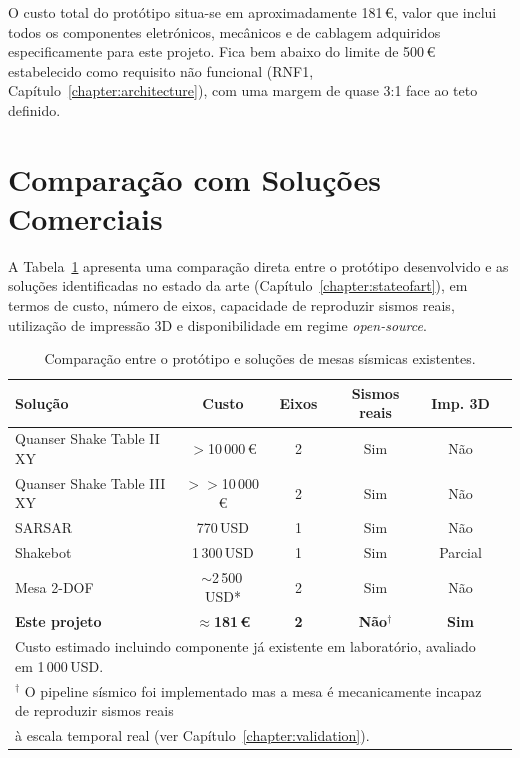O custo total do protótipo situa-se em aproximadamente 181\,\euro{}, valor que inclui todos os componentes eletrónicos, mecânicos e de cablagem adquiridos especificamente para este projeto. Fica bem abaixo do limite de 500\,\euro{} estabelecido como requisito não funcional (RNF1, Capítulo~\ref{chapter:architecture}), com uma margem de quase 3:1 face ao teto definido.
\section{Comparação com Soluções Comerciais}
\label{sec:comparacao-comercial}

A Tabela~\ref{tab:comparacao-custos} apresenta uma comparação direta entre o protótipo desenvolvido e as soluções identificadas no estado da arte (Capítulo~\ref{chapter:stateofart}), em termos de custo, número de eixos, capacidade de reproduzir sismos reais, utilização de impressão 3D e disponibilidade em regime \textit{open-source}.

\begin{table}[h]
\centering
\caption{Comparação entre o protótipo e soluções de mesas sísmicas existentes.}
\label{tab:comparacao-custos}
\begin{tabular}{lccccc}
\hline
\textbf{Solução} & \textbf{Custo} & \textbf{Eixos} & \textbf{Sismos reais} & \textbf{Imp. 3D} \\
\hline
Quanser Shake Table II XY~\cite{QuanserShakeTableIIXY} & $>$10\,000\,\euro{} & 2 & Sim & Não \\
Quanser Shake Table III XY~\cite{QuanserShakeTableIII} & $>>$10\,000\,\euro{} & 2 & Sim & Não \\
SARSAR~\cite{Damci2018}                                & 770\,USD   & 1 & Sim & Não \\
Shakebot~\cite{Shakebot2022}                           & 1\,300\,USD        & 1 & Sim & Parcial \\
Mesa 2-DOF~\cite{2DOF2025}                             & $\sim$2\,500\,USD* & 2 & Sim & Não \\
\textbf{Este projeto}                                  & \textbf{$\approx$181\,\euro{}} & \textbf{2} & \textbf{Não$^\dagger$} & \textbf{Sim} \\
\hline
\multicolumn{5}{l}{\footnotesize * Custo estimado incluindo componente já existente em laboratório, avaliado em 1\,000\,USD.} \\
\multicolumn{5}{l}{\footnotesize $^\dagger$ O pipeline sísmico foi implementado mas a mesa é mecanicamente incapaz de reproduzir sismos reais} \\
\multicolumn{5}{l}{\footnotesize \phantom{$^\dagger$} à escala temporal real (ver Capítulo~\ref{chapter:validation}).} \\
\end{tabular}
\end{table}

